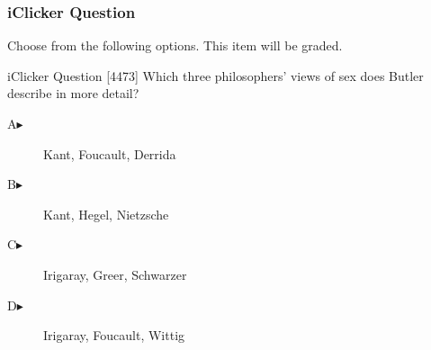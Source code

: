 \begin{frame}
  \frametitle{iClicker Question}
Choose from the following options. This item will be graded.
\begin{block}{iClicker Question}
[4473] Which three philosophers' views of sex does Butler describe in more detail?
\end{block}
\begin{description}
\item[A\hspace{.2in}$\blacktriangleright$] Kant, Foucault, Derrida
\item[B\hspace{.2in}$\blacktriangleright$] Kant, Hegel, Nietzsche
\item[C\hspace{.2in}$\blacktriangleright$] Irigaray, Greer, Schwarzer
\item[D\hspace{.2in}$\blacktriangleright$] Irigaray, Foucault, Wittig
\end{description}
\end{frame}
